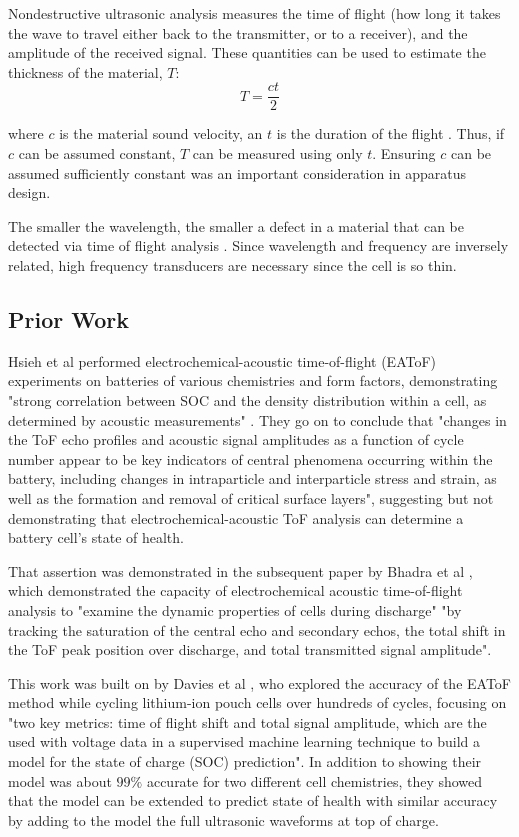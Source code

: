 Nondestructive ultrasonic analysis measures the time of flight (how long it takes the wave to travel either back to the transmitter, or to a receiver), and the amplitude of the received signal. 
These quantities can be used to estimate the thickness of the material, $T$:
$$ T = \frac{ct}{2}$$

where $c$ is the material sound velocity, an $t$ is the duration of the flight \cite{OLYMPUS}. 
Thus, if $c$ can be assumed constant, $T$ can be measured using only $t$.
Ensuring $c$ can be assumed sufficiently constant was an important consideration in apparatus design.

The smaller the wavelength, the smaller a defect in a material that can be detected via time of flight analysis \cite{OLYMPUS}. Since wavelength and frequency are inversely related, high frequency transducers are necessary since the cell is so thin.

\subsection{Prior Work}

Hsieh et al  performed electrochemical-acoustic time-of-flight (EAToF) experiments on batteries of various chemistries and form factors, demonstrating "strong correlation between SOC and the density distribution within a cell, as determined by acoustic measurements" \cite{TOF-STATE}. They go on to conclude that "changes in the ToF echo profiles and acoustic signal amplitudes as a function of cycle number appear to be key indicators of central phenomena occurring within the battery, including changes in intraparticle and interparticle stress and strain, as well as the formation and removal of critical surface layers", suggesting but not demonstrating that electrochemical-acoustic ToF analysis can determine a battery cell's state of health.

That assertion was demonstrated in the subsequent paper by Bhadra et al  \cite{ANODE-CHAR}, which demonstrated the capacity of electrochemical acoustic time-of-flight analysis to "examine the dynamic properties of cells during discharge" "by tracking the saturation of the central echo and secondary echos, the total shift in the ToF peak position over discharge, and total transmitted signal amplitude".

This work was built on by Davies et al  \cite{SOC-SOH-EST}, who explored the accuracy of the EAToF method while cycling lithium-ion pouch cells over hundreds of cycles, focusing on "two key metrics: time of flight shift and total signal amplitude, which are the used with voltage data in a supervised machine learning technique to build a model for the state of charge (SOC) prediction". 
In addition to showing their model was about $99\%$ accurate for two different cell chemistries, they showed that the model can be extended to predict state of health with similar accuracy by adding to the model the full ultrasonic waveforms at top of charge.